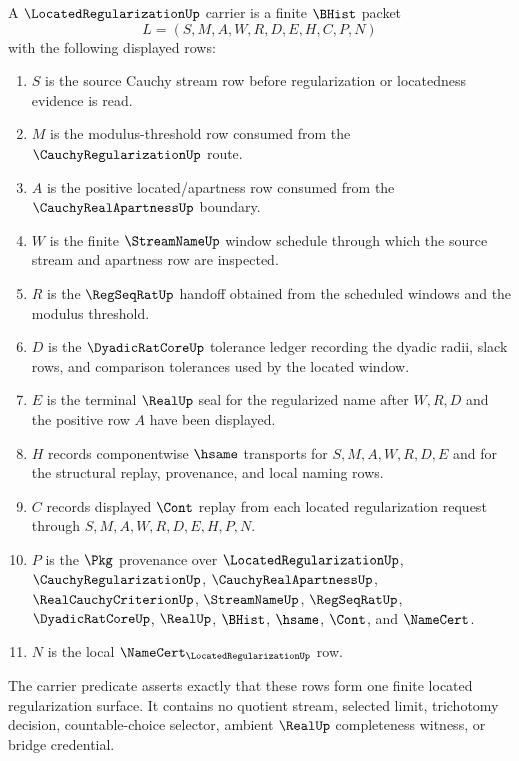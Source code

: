 \begin{definition}
\label{def:located-regularization-carrier}
A $\LocatedRegularizationUp$ carrier is a finite $\BHist$ packet
$$
L=(S,M,A,W,R,D,E,H,C,P,N)
$$
with the following displayed rows:
\begin{enumerate}
\item $S$ is the source Cauchy stream row before regularization or locatedness evidence is read.
\item $M$ is the modulus-threshold row consumed from the $\CauchyRegularizationUp$ route.
\item $A$ is the positive located/apartness row consumed from the $\CauchyRealApartnessUp$ boundary.
\item $W$ is the finite $\StreamNameUp$ window schedule through which the source stream and apartness row are inspected.
\item $R$ is the $\RegSeqRatUp$ handoff obtained from the scheduled windows and the modulus threshold.
\item $D$ is the $\DyadicRatCoreUp$ tolerance ledger recording the dyadic radii, slack rows, and comparison tolerances used by the located window.
\item $E$ is the terminal $\RealUp$ seal for the regularized name after $W,R,D$ and the positive row $A$ have been displayed.
\item $H$ records componentwise $\hsame$ transports for $S,M,A,W,R,D,E$ and for the structural replay, provenance, and local naming rows.
\item $C$ records displayed $\Cont$ replay from each located regularization request through $S,M,A,W,R,D,E,H,P,N$.
\item $P$ is the $\Pkg$ provenance over $\LocatedRegularizationUp$, $\CauchyRegularizationUp$, $\CauchyRealApartnessUp$, $\RealCauchyCriterionUp$, $\StreamNameUp$, $\RegSeqRatUp$, $\DyadicRatCoreUp$, $\RealUp$, $\BHist$, $\hsame$, $\Cont$, and $\NameCert$.
\item $N$ is the local $\NameCert_{\LocatedRegularizationUp}$ row.
\end{enumerate}
The carrier predicate asserts exactly that these rows form one finite located regularization surface. It contains no quotient stream, selected limit, trichotomy decision, countable-choice selector, ambient $\RealUp$ completeness witness, or bridge credential.
\end{definition}

